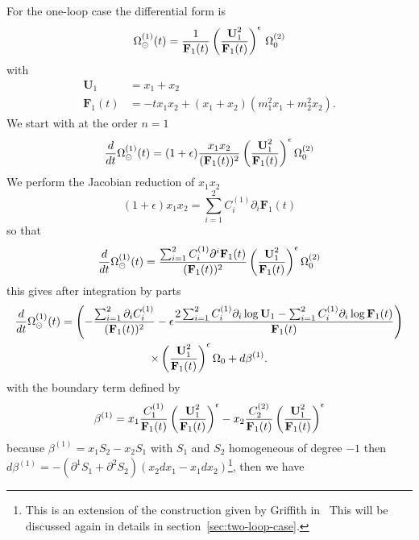 \documentclass[a4paper,12pt]{article}
\numberwithin{equation}{section}
\numberwithin{figure}{section}
\def\su{\circleddash}
\begin{document}
For the one-loop case the differential form is
\begin{equation}
  \Omega_\su^{(1)}(t)={1\over
    \textbf{F}_1(t)}\left(\textbf{U}_1^2\over \textbf{F}_1(t)\right)^\epsilon  \,\Omega_0^{(2)}
\end{equation}
with
\begin{align}
 \textbf{U}_1&=x_1+x_2\\
  \textbf{F}_1(t)&=-tx_1x_2+(x_1+x_2)(m_1^2x_1+m_2^2x_2).
\end{align}
We start with at the order $n=1$
\begin{equation}
{ d\over dt}
 \Omega^{(1)}_\su(t)= (1+\epsilon){x_1x_2\over (\textbf{F}_1(t))^2}
 \left(\textbf{U}_1^2\over \textbf{F}_1(t)\right)^\epsilon  \Omega_0^{(2)}
\end{equation}
%
We perform the Jacobian reduction of $x_1x_2$
\begin{equation}\label{e:reduc1loop}
 (1+\epsilon) x_1x_2= \sum_{i=1}^2 C_i^{(1)}\partial_i \textbf{F}_1(t)
\end{equation}
%
so that
\begin{equation}
{ d\over dt}
 \Omega^{(1)}_\su(t)= {\sum_{i=1}^2 C_i^{(1)}\partial^i \textbf{F}_1(t)\over (\textbf{F}_1(t))^2}
 \left(\textbf{U}_1^2\over \textbf{F}_1(t)\right)^\epsilon  \Omega_0^{(2)}
\end{equation}
this gives after integration by parts
\begin{multline}\label{e:PF1loopstep1}
 {d\over dt}
 \Omega^{(1)}_\su(t)=
 \left(-{\sum_{i=1}^2 \partial_i C_i^{(1)}\over
     (\textbf{F}_1(t))^2}-\epsilon{2\sum_{i=1}^2 C_i^{(1)}\partial_i
     \log \textbf{U}_1-\sum_{i=1}^2 C_i^{(1)}\partial_i
     \log \textbf{F}_1(t)\over \textbf{F}_1(t)}\right)\cr \times\left(\textbf{U}_1^2\over \textbf{F}_1(t)\right)^\epsilon \Omega_0+d\beta^{(1)}.
\end{multline}
%
with the boundary term defined by
\begin{equation}
  \beta^{(1)}=x_1  {C_1^{(1)}  \over  \textbf{F}_1(t) } \left(\textbf{U}_{1}^2\over
    \textbf{F}_1(t)\right)^\epsilon -  x_2  {C_2^{(2)}  \over  \textbf{F}_1(t) } \left(\textbf{U}_1^2\over
    \textbf{F}_1(t)\right)^\epsilon
\end{equation}
because $\beta^{(1)}= x_1 S_2-  x_2 S_1$ with $S_1$ and $S_2$ homogeneous
of degree $-1$ then $d\beta^{(1)}=- (\partial^1 S_1+\partial^2 S_2)
(x_2dx_1- x_1dx_2)$\footnote{This is an extension of the
  construction given by Griffith in~\cite{Griffiths_1969} This will be
  discussed again in details in section~\ref{sec:two-loop-case}.}, then we have 
\end{document}
